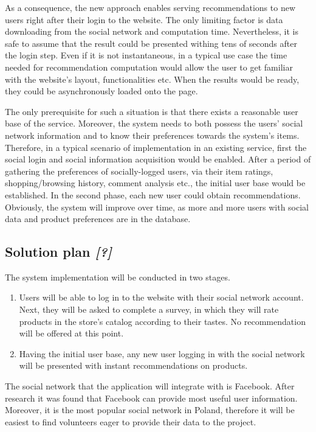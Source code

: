 \documentclass[12pt]{report}
\begin{document}
As a consequence, the new approach enables serving recommendations to new users right after their login to the website. The only limiting factor is data downloading from the social network and computation time. Nevertheless, it is safe to assume that the result could be presented withing tens of seconds after the login step. Even if it is not instantaneous, in a typical use case the time needed for recommendation computation would allow the user to get familiar with the website's layout, functionalities etc. When the results would be ready, they could be asynchronously loaded onto the page. 

The only prerequisite for such a situation is that there exists a reasonable user base of the service. Moreover, the system needs to both possess the users' social network information and to know their preferences towards the system's items. Therefore, in a typical scenario of implementation in an existing service, first the social login and social information acquisition would be enabled. After a period of gathering the preferences of socially-logged users, via their item ratings, shopping/browsing history, comment analysis etc., the initial user base would be established. In the second phase, each new user could obtain recommendations. Obviously, the system will improve over time, as more and more users with social data and product preferences are in the database.

\subsection{Solution plan \textit{[?]}}

The system implementation will be conducted in two stages.
\begin{enumerate}
\item Users will be able to log in to the website with their social network account. Next, they will be asked to complete a survey, in which they will rate products in the store's catalog according to their tastes. No recommendation will be offered at this point.
\item Having the initial user base, any new user logging in with the social network will be presented with instant recommendations on products.
\end{enumerate}

The social network that the application will integrate with is Facebook. After research it was found that Facebook can provide most useful user information. Moreover, it is the most popular social network in Poland, therefore it will be easiest to find volunteers eager to provide their data to the project.
\end{document}

